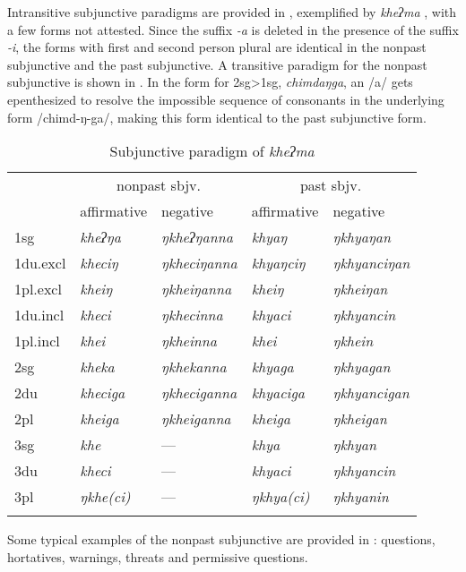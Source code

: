 Intransitive  subjunctive paradigms are provided in , exemplified by \emph{kheʔma} ,  with a few forms not attested. Since the suffix \emph{-a} is deleted in the presence of the suffix \emph{-i}, the forms with first and second person plural are identical in the nonpast subjunctive and the past subjunctive. A transitive paradigm for the nonpast subjunctive is shown in .  In the  form for {\sc 2sg>1sg}, \emph{chimdaŋga}, an /a/ gets epenthesized to resolve the impossible sequence of consonants in the underlying form /chimd-ŋ-ga/, making this form  identical to  the past subjunctive form.

\begin{table}[htp]
\begin{tabular}{lllll}
\lsptoprule
&\multicolumn{2}{c}{{\sc nonpast sbjv.}}&\multicolumn{2}{c}{{\sc past sbjv.}}\\
		&{\sc affirmative} & {\sc negative} & {\sc affirmative} & {\sc negative}  \\
\midrule
		{\sc 1sg}& \it kheʔŋa& \it ŋkheʔŋanna& \it khyaŋ& \it ŋkhyaŋan \\
		{\sc 1du.excl}& \it kheciŋ& \it ŋkheciŋanna& \it khyaŋciŋ& \it ŋkhyanciŋan \\
		{\sc 1pl.excl}& \it kheiŋ& \it ŋkheiŋanna& \it kheiŋ& \it ŋkheiŋan \\
		{\sc 1du.incl}& \it kheci& \it ŋkhecinna& \it khyaci& \it ŋkhyancin \\
		{\sc1pl.incl}& \it khei& \it ŋkheinna& \it khei& \it ŋkhein \\
\midrule
		{\sc 2sg}& \it kheka& \it ŋkhekanna& \it khyaga& \it ŋkhyagan \\
		{\sc 2du}& \it kheciga& \it ŋkheciganna& \it khyaciga& \it ŋkhyancigan \\
		{\sc2pl}& \it kheiga& \it ŋkheiganna& \it kheiga& \it ŋkheigan \\
\midrule
		{\sc 3sg}& \it khe& — & \it khya& \it ŋkhyan \\
		{\sc 3du}& \it kheci&   — & \it khyaci& \it ŋkhyancin \\
		{\sc 3pl}& \it ŋkhe(ci)&   — & \it ŋkhya(ci)& \it ŋkhyanin \\
\lspbottomrule	
\end{tabular}
\caption{Subjunctive paradigm of \emph{kheʔma} }\label{par-sbjv-intr}
\end{table}


  Some typical examples of the nonpast subjunctive are provided in \Next: questions, hortatives, warnings,  threats and permissive questions.   

